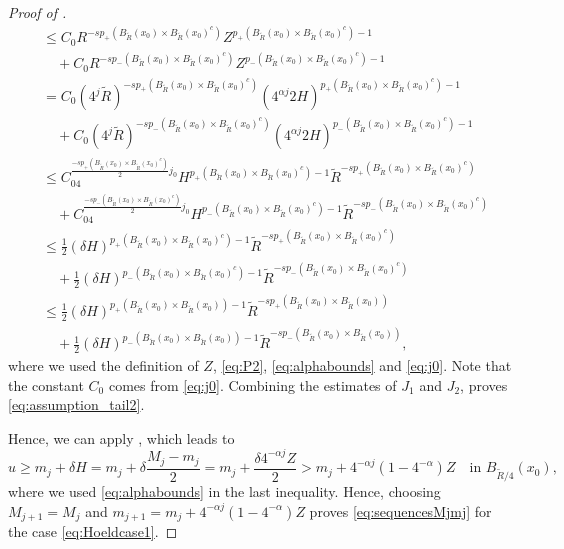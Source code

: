 \documentclass[10pt,a4paper]{amsart}
\begin{document}
\begin{proof} [Proof of ]
\begin{equation}
\begin{aligned}
& \leq C_0R^{-sp_{+}(B_{\widetilde{R}}(x_0)\times B_{\widetilde{R}}(x_0)^c)}Z^{p_{+}(B_{\widetilde{R}}(x_0)\times B_{\widetilde{R}}(x_0)^c)-1} \\
& \quad + C_0R^{-sp_{-}(B_{\widetilde{R}}(x_0)\times B_{\widetilde{R}}(x_0)^c)}Z^{p_{-}(B_{\widetilde{R}}(x_0)\times B_{\widetilde{R}}(x_0)^c)-1} \\
& =C_0(4^{j}\widetilde{R})^{-sp_{+}(B_{\widetilde{R}}(x_0)\times B_{\widetilde{R}}(x_0)^c)}(4^{\alpha j}2H)^{p_{+}(B_{\widetilde{R}}(x_0)\times B_{\widetilde{R}}(x_0)^c)-1} \\
& \quad + C_0(4^{j}\widetilde{R})^{-sp_{-}(B_{\widetilde{R}}(x_0)\times B_{\widetilde{R}}(x_0)^c)}(4^{\alpha j}2H)^{p_{-}(B_{\widetilde{R}}(x_0)\times B_{\widetilde{R}}(x_0)^c)-1} \\
& \leq C_04^{\frac{-sp_{+}(B_{\widetilde{R}}(x_0)\times B_{\widetilde{R}}(x_0)^c)}{2}j_0}H^{p_{+}(B_{\widetilde{R}}(x_0)\times B_{\widetilde{R}}(x_0)^c)-1}\widetilde{R}^{-sp_{+}(B_{\widetilde{R}}(x_0)\times B_{\widetilde{R}}(x_0)^c)} \\
& \quad +C_04^{\frac{-sp_{-}(B_{\widetilde{R}}(x_0)\times B_{\widetilde{R}}(x_0)^c)}{2}j_0}H^{p_{-}(B_{\widetilde{R}}(x_0)\times B_{\widetilde{R}}(x_0)^c)-1}\widetilde{R}^{-sp_{-}(B_{\widetilde{R}}(x_0)\times B_{\widetilde{R}}(x_0)^c)} \\
& \leq \frac{1}{2}(\delta H)^{p_+(B_{\widetilde{R}}(x_0)\times B_{\widetilde{R}}(x_0)^c) - 1} \widetilde{R}^{-sp_+(B_{\widetilde{R}}(x_0)\times B_{\widetilde{R}}(x_0)^c)}\\
&\quad + \frac{1}{2}(\delta H)^{p_-(B_{\widetilde{R}}(x_0)\times B_{\widetilde{R}}(x_0)^c)-1} \widetilde{R}^{-sp_-(B_{\widetilde{R}}(x_0)\times B_{\widetilde{R}}(x_0)^c)} \\
& \leq \frac{1}{2}(\delta H)^{p_+(B_{\widetilde{R}}(x_0)\times B_{\widetilde{R}}(x_0)) - 1} \widetilde{R}^{-sp_+(B_{\widetilde{R}}(x_0)\times B_{\widetilde{R}}(x_0))} \\
&\quad +\frac{1}{2}(\delta H)^{p_-(B_{\widetilde{R}}(x_0)\times B_{\widetilde{R}}(x_0))-1} \widetilde{R}^{-sp_-(B_{\widetilde{R}}(x_0)\times B_{\widetilde{R}}(x_0))},
\end{aligned}
\end{equation}
where we used the definition of $Z$, \eqref{eq:P2}, \eqref{eq:alphabounds} and \eqref{eq:j0}. 
Note that the constant $C_0$ comes from \eqref{eq:j0}. Combining the estimates of $J_1$ and $J_2$, proves \eqref{eq:assumption_tail2}.

Hence, we can apply , which leads to
\[ u\geq m_j+\delta H = m_j+\delta \frac{M_{j}-m_j}{2} = m_j + \frac{\delta 4^{-\alpha j}Z}{2} > m_j+4^{-\alpha j}(1-4^{-\alpha})Z \quad \text{in } B_{\widetilde{R}/4}(x_0), \]
where we used \eqref{eq:alphabounds} in the last inequality. 
Hence, choosing $M_{j+1} = M_j$ and $m_{j+1}=m_j+4^{-\alpha j}(1-4^{-\alpha})Z$ proves \eqref{eq:sequencesMjmj} for the case \eqref{eq:Hoeldcase1}.


\end{proof}
\end{document}
